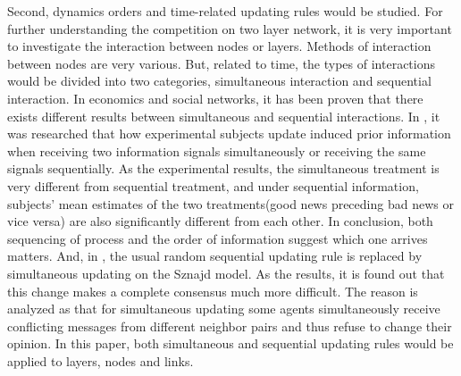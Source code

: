 Second, dynamics orders and time-related updating rules would be studied. For further understanding the competition on two layer network, it is very important to investigate the interaction between nodes or layers. Methods of interaction between nodes are very various.\parencite{sirbu2017} But, related to time, the types of interactions  would be divided into two categories, simultaneous interaction and sequential interaction. In economics and social networks, it has been proven that there exists different results between simultaneous and sequential interactions.\parencite{hoffman2011, dietrich2004} In \parencite{hoffman2011}, it was researched that how experimental subjects update induced prior information when receiving two information signals simultaneously or receiving the same signals sequentially. As the experimental results, the simultaneous treatment is very different from sequential treatment, and under sequential information,  subjects’ mean estimates of the two treatments(good news preceding bad news or vice versa) are also significantly different from each other. In conclusion, both sequencing of process and the order of information suggest which one arrives matters. And, in \parencite{dietrich2004}, the usual random sequential updating rule is replaced  by simultaneous updating on the Sznajd model. As the results, it is found out that this change makes a complete consensus much more difficult. The reason is analyzed as that for simultaneous updating some agents simultaneously receive conflicting messages from different neighbor pairs and thus refuse to change their opinion. In this paper, both simultaneous and sequential updating rules would be applied to layers, nodes and links. 

